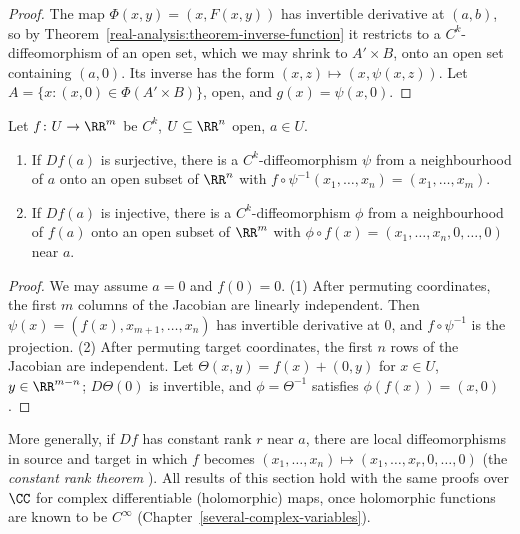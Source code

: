 \begin{proof}
The map $\Phi(x, y) = (x, F(x, y))$ has invertible derivative at $(a, b)$, so by Theorem~\ref{real-analysis:theorem-inverse-function} it restricts to a $C^k$-diffeomorphism of an open set, which we may
shrink to $A' \times B$, onto an open set containing $(a, 0)$. Its inverse has the form $(x, z) \mapsto (x, \psi(x, z))$. Let $A = \{x : (x, 0) \in \Phi(A' \times B)\}$, open, and $g(x) = \psi(x, 0)$.
\end{proof}

\begin{theorem}\label{real-analysis:theorem-submersion-immersion}
Let $f \colon U \to \RR^m$ be $C^k$, $U \subseteq \RR^n$ open, $a \in U$.
\begin{enumerate}
\item If $Df(a)$ is surjective, there is a $C^k$-diffeomorphism $\psi$ from a neighbourhood of $a$ onto an open subset of $\RR^n$ with $f \circ \psi^{-1}(x_1, \ldots, x_n) = (x_1, \ldots, x_m)$.
\item If $Df(a)$ is injective, there is a $C^k$-diffeomorphism $\phi$ from a neighbourhood of $f(a)$ onto an open subset of $\RR^m$ with $\phi \circ f(x) = (x_1, \ldots, x_n, 0, \ldots, 0)$ near $a$.
\end{enumerate}
\end{theorem}

\begin{proof}
We may assume $a = 0$ and $f(0) = 0$. (1) After permuting coordinates, the first $m$ columns of the Jacobian are linearly independent. Then $\psi(x) = (f(x), x_{m+1}, \ldots, x_n)$ has invertible
derivative at $0$, and $f \circ \psi^{-1}$ is the projection. (2) After permuting target coordinates, the first $n$ rows of the Jacobian are independent. Let $\Theta(x, y) = f(x) + (0, y)$ for $x \in U$,
$y \in \RR^{m-n}$; $D\Theta(0)$ is invertible, and $\phi = \Theta^{-1}$ satisfies $\phi(f(x)) = (x, 0)$.
\end{proof}

\begin{remark}\label{real-analysis:remark-constant-rank}
More generally, if $Df$ has constant rank $r$ near $a$, there are local diffeomorphisms in source and target in which $f$ becomes $(x_1, \ldots, x_n) \mapsto (x_1, \ldots, x_r, 0, \ldots, 0)$ (the
\emph{constant rank theorem} \cite[Theorem 4.12]{lee-smooth-manifolds}). All results of this section hold with the same proofs over $\CC$ for complex differentiable (holomorphic) maps, once
holomorphic functions are known to be $C^\infty$ (Chapter~\ref{several-complex-variables}).
\end{remark}

